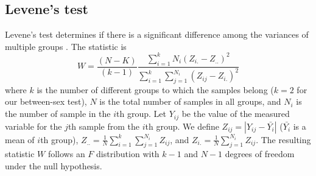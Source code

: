 \documentclass[11pt]{article}
\begin{document}
%
%
%







\subsection{Levene's test}

Levene's test determines if there is a significant difference among the variances of multiple groups \citep{Brown:1974aa}.
%
The statistic is
%
%
\begin{equation}
W = \displaystyle\frac{(N-K)}{(k-1)} \displaystyle\frac{\sum_{i=1}^k N_i (Z_{i.} - Z_{..})^2}{ \sum_{i=1}^k \sum_{j=1}^{N_i} (Z_{ij} - Z_{i.})^2 }
\end{equation}
%
where $k$ is the number of different groups to which the samples belong ($k=2$ for our between-sex test), $N$ is the total number of samples in all groups,
and $N_i$ is the number of sample in the $i$th group. 
Let $Y_{ij}$ be the value of the measured variable for the $j$th sample from the $i$th group.
We define $Z_{ij} = |Y_{ij} - \bar{Y_i} |$ ($\bar{Y_i}$ is a mean of $i$th group), $Z_{..} = \displaystyle\frac{1}{N} \sum_{i=1}^k \sum_{j=1}^{N_i} Z_{ij}$,
 and $Z_{i.} =  \displaystyle\frac{1}{N} \sum_{j=1}^{N_i} Z_{ij} $. The resulting statistic $W$ follows an $F$ distribution with 
$k-1$ and $N-1$ degrees of freedom under the null hypothesis.
%
\end{document}

